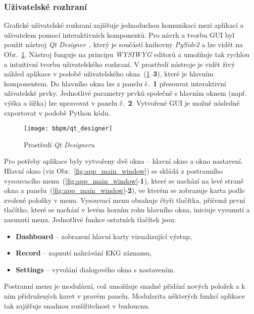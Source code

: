 \subsubsection{Uživatelské rozhraní}
\label{section:gui}
Grafické uživatelské rozhraní zajišťuje jednoduchou komunikaci mezi aplikací a
uživatelem pomocí interaktivních komponentů. Pro návrh a tvorbu GUI byl použit
nástroj \textit{Qt Designer}~\cite{QtDesigner}, který je součástí knihovny
\textit{PySide2} a lze vidět na Obr.~\ref{fig:qt_designer}. Nástroj funguje na
principu \textit{WYSIWYG} editorů a umožňuje tak rychlou a intuitivní tvorbu
uživatelského rozhraní. V prostředí nástroje je vidět živý náhled aplikace v
podobě uživatelského okna~(\ref{fig:qt_designer}--\textbf{3}), které je hlavním
komponentem. Do hlavního okna lze z panelu č.~\textbf{1} přesouvat interaktivní
uživatelské prvky. Jednotlivé parametry prvků společně s hlavním oknem (např.
výška a šířka) lze upravovat v panelu č.~\textbf{2}. Vytvořené GUI je možné
následně exportovat v podobě Python kódu.

\begin{figure}[h]
    \begin{center}
        \texttt{[image: bbpm/qt\_designer]}
        \caption{Prostředí \textit{Qt Designeru}}
        \label{fig:qt_designer}
    \end{center}
\end{figure}

\clearpage

Pro potřeby aplikace byly vytvořeny dvě okna -- hlavní okno a okno nastavení.
Hlavní okno (viz Obr.~\ref{fig:app_main_window}) se skládá z postranního
vysouvacího menu~(\ref{fig:app_main_window}-\textbf{1}), které se nachází na
levé straně okna a panelu~(\ref{fig:app_main_window}-\textbf{2}), ve kterém se
zobrazuje karta podle zvolené položky v menu. Vysouvací menu obsahuje čtyři
tlačítka, přičemž první tlačítko, které se nachází v levém horním rohu hlavního
okna, iniciuje vysunutí a zasunutí menu. Jednotlivé funkce ostatních tlačítek
jsou:
\begin{itemize}[noitemsep]
    \item \textbf{Dashboard} -- zobrazení hlavní karty vizualizující výstup,
    \item \textbf{Record} -- zapnutí nahrávání EKG záznamu,
    \item \textbf{Settings} -- vyvolání dialogového okna s nastavením.
\end{itemize}
Postranní menu je modulární, což umožňuje snadné přidání nových položek a k nim
přidružených karet v pravém panelu. Modularita některých funkcí aplikace tak
zajišťuje snadnou rozšířitelnost v budoucnu.

